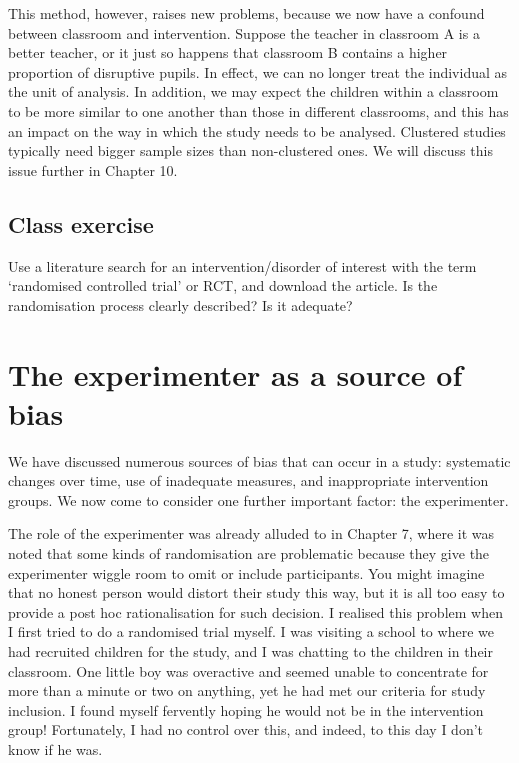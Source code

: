 \documentclass[]{book}
\begin{document}
This method, however, raises new problems, because we now have a confound between classroom and intervention. Suppose the teacher in classroom A is a better teacher, or it just so happens that classroom B contains a higher proportion of disruptive pupils. In effect, we can no longer treat the individual as the unit of analysis. In addition, we may expect the children within a classroom to be more similar to one another than those in different classrooms, and this has an impact on the way in which the study needs to be analysed. Clustered studies typically need bigger sample sizes than non-clustered ones. We will discuss this issue further in Chapter 10.

\hypertarget{class-exercise-3}{%
\section{Class exercise}\label{class-exercise-3}}

Use a literature search for an intervention/disorder of interest with the term `randomised controlled trial' or RCT, and download the article.
Is the randomisation process clearly described? Is it adequate?

\hypertarget{the-experimenter-as-a-source-of-bias}{%
\chapter{The experimenter as a source of bias}\label{the-experimenter-as-a-source-of-bias}}

We have discussed numerous sources of bias that can occur in a study: systematic changes over time, use of inadequate measures, and inappropriate intervention groups. We now come to consider one further important factor: the experimenter.

The role of the experimenter was already alluded to in Chapter 7, where it was noted that some kinds of randomisation are problematic because they give the experimenter wiggle room to omit or include participants. You might imagine that no honest person would distort their study this way, but it is all too easy to provide a post hoc rationalisation for such decision. I realised this problem when I first tried to do a randomised trial myself. I was visiting a school to where we had recruited children for the study, and I was chatting to the children in their classroom. One little boy was overactive and seemed unable to concentrate for more than a minute or two on anything, yet he had met our criteria for study inclusion. I found myself fervently hoping he would not be in the intervention group! Fortunately, I had no control over this, and indeed, to this day I don't know if he was.
\end{document}
